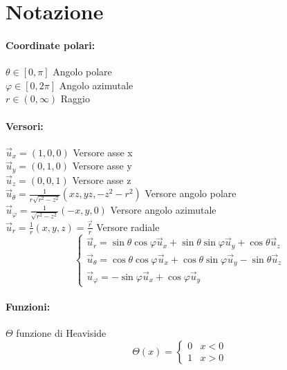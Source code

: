 \chapter{Notazione}
%
\subsubsection{Coordinate polari:}
 $\theta \in[0,\pi]$ Angolo polare\\
 $\varphi \in [0,2\pi]$ Angolo azimutale\\
 $r \in (0,\infty)$ Raggio\\

\subsubsection{Versori:}
$\vec u_x = (1,0,0)$ Versore asse x \\
$\vec u_y = (0,1,0)$ Versore asse y \\
$\vec u_z = (0,0,1)$ Versore asse z \\

$\vec u _\theta = \frac{1}{r\sqrt{r^2-z^2}}(xz,yz,-z^2-r^2)$ Versore angolo polare \\
$\vec u _\varphi = \frac{1}{\sqrt{r^2-z^2}}(-x,y,0)$ Versore angolo azimutale \\
$\vec u _r = \frac{1}{r}(x,y,z) = \frac{\vec r}{r}$ Versore radiale \\

\begin{equation}\label{eq:versors}
   \begin{cases}
       \vec u_r = \sin\theta \cos\varphi \vec u _x
                + \sin\theta \sin\varphi \vec u _y + \cos\theta \vec u _z\\
       \vec u_\theta = \cos\theta \cos\varphi \vec u _x +
                       \cos\theta \sin\varphi \vec u _y - \sin\theta \vec u _z\\
       \vec u_\varphi = -\sin\varphi \vec u _x + \cos\varphi \vec u _y
   \end{cases}
\end{equation}

\subsubsection{Funzioni:}
$\Theta$ funzione di Heaviside
$$
    \Theta(x) = \begin{cases}
       0 & x < 0\\
       1 & x > 0
    \end{cases}
$$

